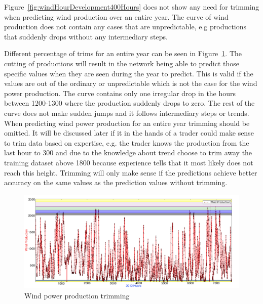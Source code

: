Figure~\ref{fig:windHourDevelopment400Hours} does not show any need for trimming when predicting wind production over an entire year. The curve of wind production does not contain any cases that are unpredictable, e.g productions that suddenly drops without any intermediary steps. 

Different percentage of trims for an entire year can be seen in Figure~\ref{fig:windProductionTrimming}. The cutting of productions will result in the network being able to predict those specific values when they are seen during the year to predict. This is valid if the values are out of the ordinary or unpredictable which is not the case for the wind power production. The curve contains only one irregular drop in the hours between 1200-1300 where the production suddenly drops to zero. The rest of the curve does not make sudden jumps and it follows intermediary steps or trends. When predicting wind power production for an entire year trimming should be omitted. It will be discussed later if it in the hands of a trader could make sense to trim data based on expertise, e.g. the trader knows the production from the last hour to 300 and due to the knowledge about trend choose to trim away the training dataset above 1800 because experience tells that it most likely does not reach this height. Trimming will only make sense if the predictions achieve better accuracy on the same values as the prediction values without trimming.

\begin{figure}[H]
\centering
\includegraphics[width=0.99\linewidth,natwidth=898,natheight=587]{billeder/windProductionTrimming.jpg}
\caption{Wind power production trimming}
\label{fig:windProductionTrimming}
\end{figure}

